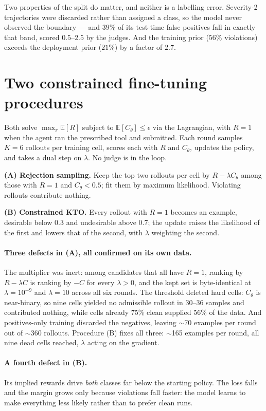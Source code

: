 \documentclass[11pt]{article}
\begin{document}
Two properties of the split do matter, and neither is a labelling error.
Severity-2 trajectories were discarded rather than assigned a class, so the model
never observed the boundary --- and $39\%$ of its test-time false positives fall
in exactly that band, scored $0.5$--$2.5$ by the judges. And the training prior
($56\%$ violations) exceeds the deployment prior ($21\%$) by a factor of $2.7$.

\section{Two constrained fine-tuning procedures}

Both solve $\max_\pi \mathbb{E}[R]$ subject to $\mathbb{E}[C_\theta] \le \epsilon$
via the Lagrangian, with $R=1$ when the agent ran the prescribed tool and
submitted. Each round samples $K{=}6$ rollouts per training cell, scores each with
$R$ and $C_\theta$, updates the policy, and takes a dual step on $\lambda$. No
judge is in the loop.

\textbf{(A) Rejection sampling.} Keep the top two rollouts per cell by
$R - \lambda C_\theta$ among those with $R{=}1$ and $C_\theta < 0.5$; fit them by
maximum likelihood. Violating rollouts contribute nothing.

\textbf{(B) Constrained KTO.} Every rollout with $R{=}1$ becomes an example,
desirable below 0.3 and undesirable above 0.7; the update raises the likelihood of
the first and lowers that of the second, with $\lambda$ weighting the second.

\paragraph{Three defects in (A), all confirmed on its own data.} The multiplier
was inert: among candidates that all have $R{=}1$, ranking by $R - \lambda C$ is
ranking by $-C$ for every $\lambda>0$, and the kept set is byte-identical at
$\lambda = 10^{-9}$ and $\lambda = 10$ across all six rounds. The threshold
deleted hard cells: $C_\theta$ is near-binary, so nine cells yielded no admissible
rollout in 30--36 samples and contributed nothing, while cells already 75\% clean
supplied 56\% of the data. And positives-only training discarded the negatives,
leaving $\sim$70 examples per round out of $\sim$360 rollouts. Procedure (B) fixes
all three: $\sim$165 examples per round, all nine dead cells reached, $\lambda$
acting on the gradient.

\paragraph{A fourth defect in (B).} Its implied rewards drive \emph{both} classes
far below the starting policy. The loss falls and the margin grows only because
violations fall faster: the model learns to make everything less likely rather
than to prefer clean runs.
\end{document}
